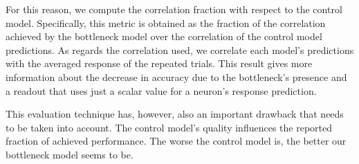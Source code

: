 For this reason, we compute the correlation fraction with respect to the control model. Specifically, this metric is obtained as the fraction of the correlation achieved by the bottleneck model over the correlation of the control model predictions. As regards the correlation used, we correlate each model’s predictions with the averaged response of the repeated trials. This result gives more information about the decrease in accuracy due to the bottleneck's presence and a readout that uses just a scalar value for a neuron’s response prediction.

This evaluation technique has, however, also an important drawback that needs to be taken into account. The control model’s quality influences the reported fraction of achieved performance. The worse the control model is, the better our bottleneck model seems to be. 









